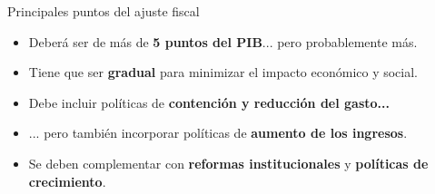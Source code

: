 \begin{frame}{Principales puntos del ajuste fiscal}
\begin{itemize}
    \item Deberá ser de más de \textbf{5 puntos del PIB}... pero probablemente más.
    \item Tiene que ser \textbf{gradual} para minimizar el impacto económico y social.
    \item Debe incluir políticas de \textbf{contención y reducción del gasto...}
    \item ... pero también incorporar políticas de  \textbf{aumento de los ingresos}.
    \item Se deben complementar con \textbf{reformas institucionales} y \textbf{políticas de crecimiento}.
\end{itemize}
\end{frame}
